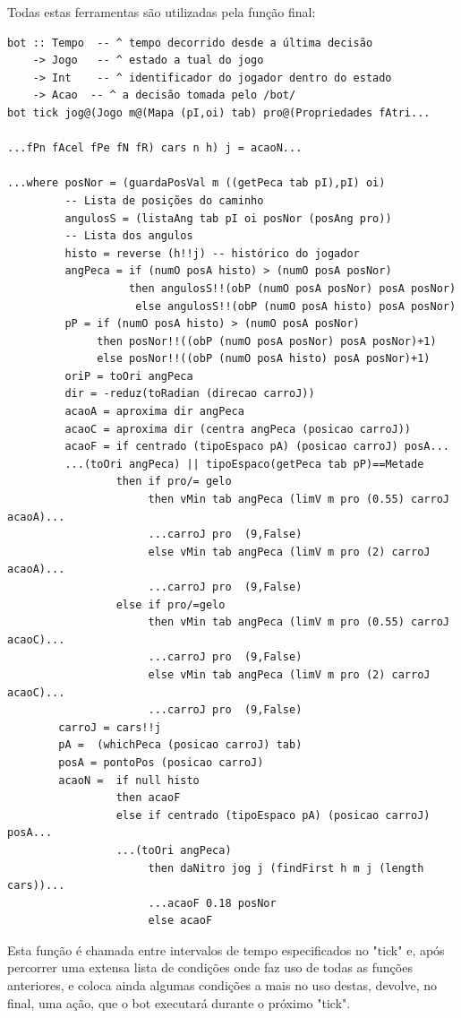\documentclass[a4paper]{report} %
\begin{document}
Todas estas ferramentas são utilizadas pela função final:
\begin{verbatim}
bot :: Tempo  -- ^ tempo decorrido desde a última decisão
    -> Jogo   -- ^ estado a tual do jogo
    -> Int    -- ^ identificador do jogador dentro do estado
    -> Acao  -- ^ a decisão tomada pelo /bot/
bot tick jog@(Jogo m@(Mapa (pI,oi) tab) pro@(Propriedades fAtri... 

...fPn fAcel fPe fN fR) cars n h) j = acaoN...

...where posNor = (guardaPosVal m ((getPeca tab pI),pI) oi) 
         -- Lista de posições do caminho 
         angulosS = (listaAng tab pI oi posNor (posAng pro)) 
         -- Lista dos angulos 
         histo = reverse (h!!j) -- histórico do jogador
         angPeca = if (numO posA histo) > (numO posA posNor)
                   then angulosS!!(obP (numO posA posNor) posA posNor)
                    else angulosS!!(obP (numO posA histo) posA posNor)
         pP = if (numO posA histo) > (numO posA posNor)
              then posNor!!((obP (numO posA posNor) posA posNor)+1)
              else posNor!!((obP (numO posA histo) posA posNor)+1)
         oriP = toOri angPeca
         dir = -reduz(toRadian (direcao carroJ))
         acaoA = aproxima dir angPeca
         acaoC = aproxima dir (centra angPeca (posicao carroJ))
         acaoF = if centrado (tipoEspaco pA) (posicao carroJ) posA... 
         ...(toOri angPeca) || tipoEspaco(getPeca tab pP)==Metade
                 then if pro/= gelo
                      then vMin tab angPeca (limV m pro (0.55) carroJ acaoA)... 
                      ...carroJ pro  (9,False)
                      else vMin tab angPeca (limV m pro (2) carroJ acaoA)... 
                      ...carroJ pro  (9,False)
                 else if pro/=gelo
                      then vMin tab angPeca (limV m pro (0.55) carroJ acaoC)... 
                      ...carroJ pro  (9,False)
                      else vMin tab angPeca (limV m pro (2) carroJ acaoC)... 
                      ...carroJ pro  (9,False)
        carroJ = cars!!j
        pA =  (whichPeca (posicao carroJ) tab)
        posA = pontoPos (posicao carroJ)
        acaoN =  if null histo
                 then acaoF
                 else if centrado (tipoEspaco pA) (posicao carroJ) posA... 
                 ...(toOri angPeca)
                      then daNitro jog j (findFirst h m j (length cars))... 
                      ...acaoF 0.18 posNor
                      else acaoF          
\end{verbatim}
Esta função é chamada entre intervalos de tempo especificados no "tick" e, após percorrer uma extensa lista de condições onde faz uso de todas as funções anteriores, e coloca ainda algumas condições a mais no uso destas, devolve, no final, uma ação, que o bot executará durante o próximo "tick". 
\end{document}
